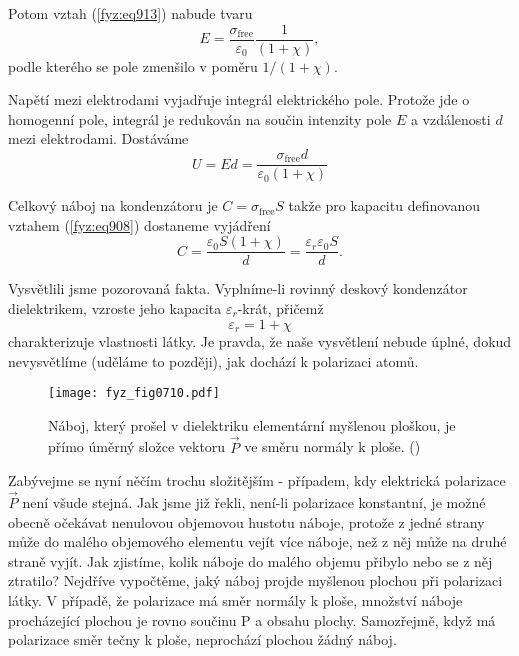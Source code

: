     Potom vztah (\ref{fyz:eq913}) nabude tvaru
    \begin{equation}\label{fyz:eq915}
      E=\dfrac{σ_{\text{free}}}{\varepsilon_0}\dfrac{1}{(1+χ)},
    \end{equation}
    podle kterého se pole zmenšilo v poměru \(1/(1+χ)\).

    Napětí mezi elektrodami vyjadřuje integrál elektrického pole. Protože jde o homogenní pole,
    integrál je redukován na součin intenzity pole \(E\) a vzdálenosti \(d\) mezi elektrodami.
    Dostáváme
    \begin{equation*}
      U = Ed = \dfrac{σ_{\text{free}}d}{\varepsilon_0(1+χ)}
    \end{equation*}

    Celkový náboj na kondenzátoru je \(C = σ_{\text{free}}S\) takže pro kapacitu definovanou vztahem
    (\ref{fyz:eq908}) dostaneme vyjádření
    \begin{equation}\label{fyz:eq916}
      C=\dfrac{\varepsilon_0S(1+χ)}{d} = \dfrac{\varepsilon_r\varepsilon_0S}{d}.
    \end{equation}

    Vysvětlili jsme pozorovaná fakta. Vyplníme-li rovinný deskový kondenzátor dielektrikem, vzroste
    jeho kapacita \(\varepsilon_r\)-krát, přičemž
    \begin{equation}\label{fyz:eq917}
      \varepsilon_r = 1+χ
    \end{equation}
    charakterizuje vlastnosti látky. Je pravda, že naše vysvětlení nebude úplné, dokud nevysvětlíme
    (uděláme to později), jak dochází k polarizaci atomů.

    \begin{figure}[ht!] %
      \centering
      \texttt{[image: fyz\_fig0710.pdf]}
      \caption{Náboj, který prošel v dielektriku elementární myšlenou ploškou, je přímo úměrný
               složce vektoru \(\vec{P}\) ve směru normály k ploše. (\cite[s.~179]{Feynman02})}
      \label{fyz:fig0710}
    \end{figure}

    Zabývejme se nyní něčím trochu složitějším - případem, kdy elektrická polarizace \(\vec{P}\)
    není všude stejná. Jak jsme již řekli, není-li polarizace konstantní, je možné obecně očekávat
    nenulovou objemovou hustotu náboje, protože z jedné strany může do malého objemového elementu
    vejít více náboje, než z něj může na druhé straně vyjít. Jak zjistíme, kolik náboje do malého
    objemu přibylo nebo se z něj ztratilo? Nejdříve vypočtěme, jaký náboj projde myšlenou plochou
    při polarizaci látky. V případě, že polarizace má směr normály k ploše, množství náboje
    procházející plochou je rovno součinu P a obsahu plochy. Samozřejmě, když má polarizace směr
    tečny k ploše, neprochází plochou žádný náboj.

